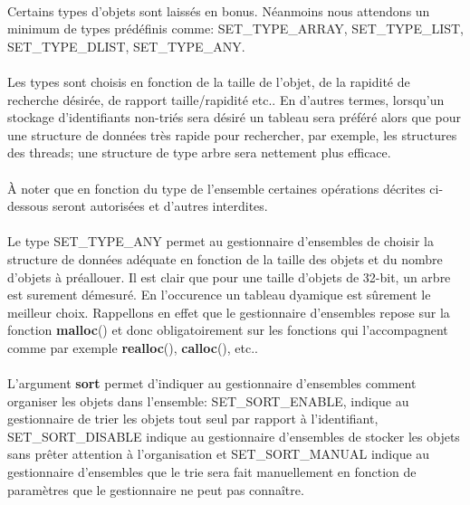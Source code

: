 \documentclass[10pt,a4wide]{article}
\begin{document}
\paragraph{}

Certains types d'objets sont laiss\'es en bonus. N\'eanmoins nous attendons
un minimum de types pr\'ed\'efinis comme: SET\_TYPE\_ARRAY, SET\_TYPE\_LIST,
SET\_TYPE\_DLIST, SET\_TYPE\_ANY.

\paragraph{}

Les types sont choisis en fonction de la taille de l'objet, de la rapidit\'e
de recherche d\'esir\'ee, de rapport taille/rapidit\'e etc.. En d'autres
termes, lorsqu'un stockage d'identifiants non-tri\'es sera d\'esir\'e
un tableau sera pr\'ef\'er\'e alors que pour une structure de donn\'ees
tr\`es rapide pour rechercher, par exemple, les structures des threads; une
structure de type arbre sera nettement plus efficace.

\paragraph{}

\`A noter que en fonction du type de l'ensemble certaines op\'erations
d\'ecrites ci-dessous seront autoris\'ees et d'autres interdites.

\paragraph{}

Le type SET\_TYPE\_ANY permet au gestionnaire d'ensembles de choisir
la structure de donn\'ees ad\'equate en fonction de la taille des objets
et du nombre d'objets \`a pr\'eallouer. Il est clair que pour une taille
d'objets de 32-bit, un arbre est surement d\'emesur\'e. En l'occurence
un tableau dyamique est s\^urement le meilleur choix. Rappellons en effet
que le gestionnaire d'ensembles repose sur la fonction \textbf{malloc}()
et donc obligatoirement sur les fonctions qui l'accompagnent comme par
exemple \textbf{realloc}(), \textbf{calloc}(), etc..

\paragraph{}

L'argument \textbf{sort} permet d'indiquer au gestionnaire d'ensembles
comment organiser les objets dans l'ensemble: SET\_SORT\_ENABLE,
indique au gestionnaire de trier les objets tout seul par rapport \`a
l'identifiant, SET\_SORT\_DISABLE indique au gestionnaire d'ensembles
de stocker les objets sans pr\^eter attention \`a l'organisation et
SET\_SORT\_MANUAL indique au gestionnaire d'ensembles que le trie sera
fait manuellement en fonction de param\`etres que le gestionnaire ne
peut pas conna\^itre.
\end{document}
